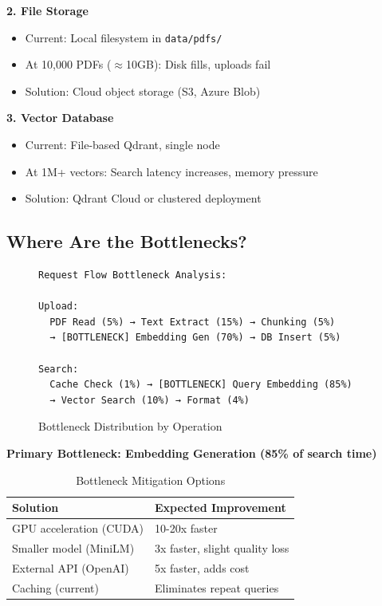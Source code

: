 \documentclass[11pt,a4paper]{article}
\begin{document}
\textbf{2. File Storage}
\begin{itemize}
    \item Current: Local filesystem in \texttt{data/pdfs/}
    \item At 10,000 PDFs ($\approx$10GB): Disk fills, uploads fail
    \item Solution: Cloud object storage (S3, Azure Blob)
\end{itemize}

\textbf{3. Vector Database}
\begin{itemize}
    \item Current: File-based Qdrant, single node
    \item At 1M+ vectors: Search latency increases, memory pressure
    \item Solution: Qdrant Cloud or clustered deployment
\end{itemize}

\subsection{Where Are the Bottlenecks?}

\begin{figure}[H]
\centering
\begin{verbatim}
Request Flow Bottleneck Analysis:

Upload:
  PDF Read (5%) → Text Extract (15%) → Chunking (5%) 
  → [BOTTLENECK] Embedding Gen (70%) → DB Insert (5%)

Search:
  Cache Check (1%) → [BOTTLENECK] Query Embedding (85%) 
  → Vector Search (10%) → Format (4%)
\end{verbatim}
\caption{Bottleneck Distribution by Operation}
\end{figure}

\textbf{Primary Bottleneck: Embedding Generation (85\% of search time)}

\begin{table}[H]
\centering
\begin{tabular}{ll}
\toprule
\textbf{Solution} & \textbf{Expected Improvement} \\
\midrule
GPU acceleration (CUDA) & 10-20x faster \\
Smaller model (MiniLM) & 3x faster, slight quality loss \\
External API (OpenAI) & 5x faster, adds cost \\
Caching (current) & Eliminates repeat queries \\
\bottomrule
\end{tabular}
\caption{Bottleneck Mitigation Options}
\end{table}
\end{document}

